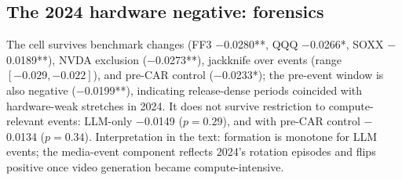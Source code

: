 \documentclass[review,12pt,authoryear]{elsarticle}
\begin{document}
\subsection{The 2024 hardware negative: forensics}
The cell survives benchmark changes (FF3 $-$0.0280**, QQQ $-$0.0266*,
SOXX $-$0.0189**), NVDA exclusion ($-$0.0273**), jackknife over events
(range $[-0.029, -0.022]$), and pre-CAR control ($-$0.0233*); the pre-event
window is also negative ($-$0.0199**), indicating release-dense periods
coincided with hardware-weak stretches in 2024. It does not survive
restriction to compute-relevant events: LLM-only $-$0.0149 ($p=0.29$), and
with pre-CAR control $-$0.0134 ($p=0.34$). Interpretation in the text:
formation is monotone for LLM events; the media-event component reflects
2024's rotation episodes and flips positive once video generation became
compute-intensive.
\end{document}
